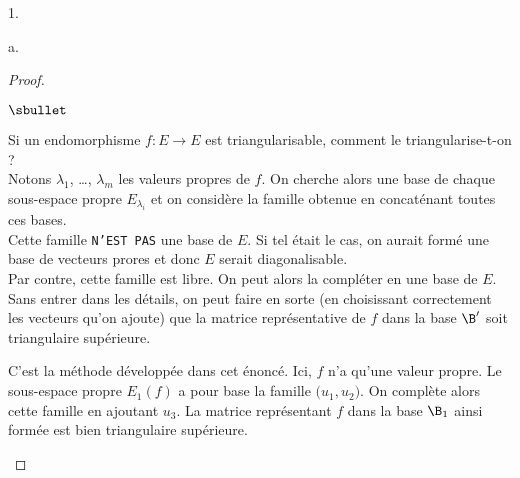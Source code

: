 \documentclass[11pt]{article}%
\begin{document}
\begin{noliste}{1.}
\begin{noliste}{a.}
\begin{proof}
\begin{remarkL}{.98}
\begin{noliste}{$\sbullet$}
        \item Si un endomorphisme $f : E \to E$ est triangularisable,
          comment le triangularise-t-on ? \\
          Notons $\lambda_1$, \ldots, $\lambda_m$ les valeurs propres
          de $f$. On cherche alors une base de chaque sous-espace
          propre $E_{\lambda_i}$ et on considère la famille obtenue en
          concaténant toutes ces bases.\\
          Cette famille {\tt N'EST PAS} une base de $E$. Si tel était
          le cas, on aurait formé une base de vecteurs prores et donc
          $E$ serait diagonalisable. \\
          Par contre, cette famille est libre. On peut alors la
          compléter en une base de $E$.\\
          Sans entrer dans les détails, on peut faire en sorte (en
          choisissant correctement les vecteurs qu'on ajoute) que la
          matrice représentative de $f$ dans la base $\B'$ soit
          triangulaire supérieure.

        \item C'est la méthode développée dans cet énoncé. Ici, $f$
          n'a qu'une valeur propre. Le sous-espace propre $E_1(f)$ a
          pour base la famille $\big( u_1, u_2 \big)$. On complète
          alors cette famille en ajoutant $u_3$. La matrice
          représentant $f$ dans la base $\B_1$ ainsi formée est
          bien triangulaire supérieure.

      \end{noliste}
    \end{remarkL}%


    \newpage


\end{proof}
\end{noliste}
\end{noliste}
\end{document}
